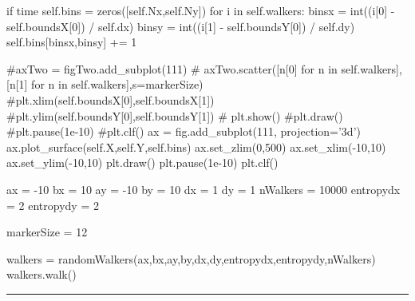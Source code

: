 \begin{codeexample}
\begin{VerbatimOut}{\listingFile}
            if time %
                self.bins = zeros([self.Nx,self.Ny])
                for i in self.walkers:
                    binsx = int((i[0] - self.boundsX[0]) / self.dx)
                    binsy = int((i[1] - self.boundsY[0]) / self.dy)
                    self.bins[binsx,binsy] += 1

                    #axTwo = figTwo.add_subplot(111)
                    # axTwo.scatter([n[0] for n in self.walkers],[n[1] for n in self.walkers],s=markerSize)
                    #plt.xlim(self.boundsX[0],self.boundsX[1])
                    #plt.ylim(self.boundsY[0],self.boundsY[1])
                #        plt.show()
                #plt.draw()
                #plt.pause(1e-10)
                #plt.clf()
                ax = fig.add_subplot(111, projection='3d')
                ax.plot_surface(self.X,self.Y,self.bins)
                ax.set_zlim(0,500)
                ax.set_xlim(-10,10)
                ax.set_ylim(-10,10)
                plt.draw()
                plt.pause(1e-10)
                plt.clf()



ax = -10
bx = 10
ay = -10
by = 10
dx = 1
dy = 1
nWalkers = 10000
entropydx = 2
entropydy = 2


markerSize = 12

walkers = randomWalkers(ax,bx,ay,by,dx,dy,entropydx,entropydy,nWalkers)
walkers.walk()


\end{VerbatimOut}
\end{codeexample}
\else
\noindent\rule{5 in}{0.01 in}
\fi



